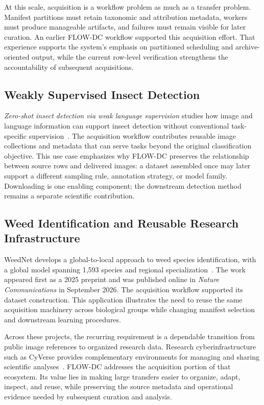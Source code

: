 At this scale, acquisition is a workflow problem as much as a transfer problem. Manifest partitions must retain taxonomic and attribution metadata, workers must produce manageable artifacts, and failures must remain visible for later curation. An earlier FLOW-DC workflow supported this acquisition effort. That experience supports the system's emphasis on partitioned scheduling and archive-oriented output, while the current row-level verification strengthens the accountability of subsequent acquisitions.

\subsection{Weakly Supervised Insect Detection}
\emph{Zero-shot insect detection via weak language supervision} studies how image and language information can support insect detection without conventional task-specific supervision~\cite{weak-insects}. The acquisition workflow contributes reusable image collections and metadata that can serve tasks beyond the original classification objective. This use case emphasizes why FLOW-DC preserves the relationship between source rows and delivered images: a dataset assembled once may later support a different sampling rule, annotation strategy, or model family. Downloading is one enabling component; the downstream detection method remains a separate scientific contribution.

\subsection{Weed Identification and Reusable Research Infrastructure}
WeedNet develops a global-to-local approach to weed species identification, with a global model spanning 1,593 species and regional specialization~\cite{weednet}. The work appeared first as a 2025 preprint and was published online in \emph{Nature Communications} in September 2026. The acquisition workflow supported its dataset construction. This application illustrates the need to reuse the same acquisition machinery across biological groups while changing manifest selection and downstream learning procedures.

Across these projects, the recurring requirement is a dependable transition from public image references to organized research data. Research cyberinfrastructure such as CyVerse provides complementary environments for managing and sharing scientific analyses~\cite{cyverse}. FLOW-DC addresses the acquisition portion of that ecosystem. Its value lies in making large transfers easier to organize, adapt, inspect, and reuse, while preserving the source metadata and operational evidence needed by subsequent curation and analysis.
